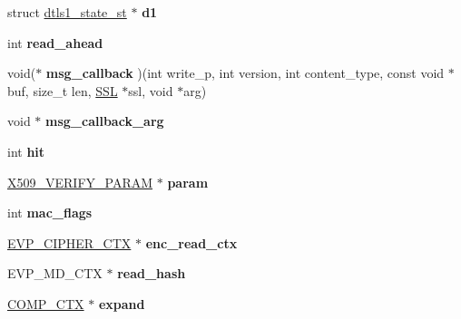 \begin{DoxyCompactItemize}
\item 
\mbox{\label{structssl__st_afd70ab79ea0917b56fa74a8cb04ddaca}} 
struct \hyperlink{structdtls1__state__st}{dtls1\+\_\+state\+\_\+st} $\ast$ {\bfseries d1}
\item 
\mbox{\label{structssl__st_a6be4ea32cec16e0cfb2034f1d8fc3f37}} 
int {\bfseries read\+\_\+ahead}
\item 
\mbox{\label{structssl__st_a0b5f95998bc3a4a4193adeca3b7b289a}} 
void($\ast$ {\bfseries msg\+\_\+callback} )(int write\+\_\+p, int version, int content\+\_\+type, const void $\ast$buf, size\+\_\+t len, \hyperlink{structssl__st}{S\+SL} $\ast$ssl, void $\ast$arg)
\item 
\mbox{\label{structssl__st_a265c0d1adbd1e76b1b326a1f82b0cfcf}} 
void $\ast$ {\bfseries msg\+\_\+callback\+\_\+arg}
\item 
\mbox{\label{structssl__st_a20d2f2c7a00b1fd70c28c81c2d6f34c2}} 
int {\bfseries hit}
\item 
\mbox{\label{structssl__st_a384d0d3915209d3d4c8144146bab78aa}} 
\hyperlink{structX509__VERIFY__PARAM__st}{X509\+\_\+\+V\+E\+R\+I\+F\+Y\+\_\+\+P\+A\+R\+AM} $\ast$ {\bfseries param}
\item 
\mbox{\label{structssl__st_a501b23b52ff9106b5cba654187324d95}} 
int {\bfseries mac\+\_\+flags}
\item 
\mbox{\label{structssl__st_ae2efb2324ed8b45b65cc2a3aa5ac1a4d}} 
\hyperlink{structevp__cipher__ctx__st}{E\+V\+P\+\_\+\+C\+I\+P\+H\+E\+R\+\_\+\+C\+TX} $\ast$ {\bfseries enc\+\_\+read\+\_\+ctx}
\item 
\mbox{\label{structssl__st_af550f07608665dad2b09a83c42ce494c}} 
E\+V\+P\+\_\+\+M\+D\+\_\+\+C\+TX $\ast$ {\bfseries read\+\_\+hash}
\item 
\mbox{\label{structssl__st_a01fd32f00c26a995e998b0ad8edb38cf}} 
\hyperlink{structcomp__ctx__st}{C\+O\+M\+P\+\_\+\+C\+TX} $\ast$ {\bfseries expand}
\item 
\mbox{\label{structssl__st_a44444bb7794521afc2b9e52cd0c2570c}} 

\end{DoxyCompactItemize}
